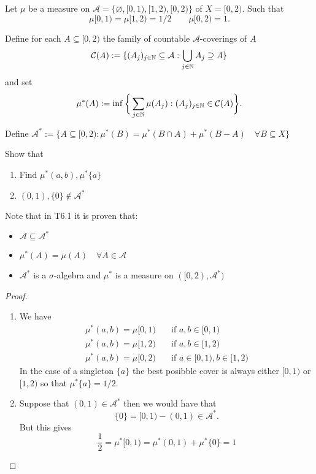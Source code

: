 \begin{thm}[Problem 6.10i]
Let \(\mu \) be a measure on \(\mathcal{A}=\{\varnothing ,[0,1),[1,2),[0,2)\}\) of $X=[0,2)$. Such that
\[
\mu [0,1)=\mu [1,2)=1/2 \qquad \mu [0,2)=1.
\]

Define for each \(A\subseteq [0,2)\) the family of countable \(\mathcal{A}\)-coverings of \(A\)
\[
\mathcal{C}(A):=\{(A_{j})_{j\in \Bbb{N}}\subseteq \mathcal{A} : \bigcup _{j\in \Bbb{N}}A_{j} \supseteq A\}
\]
and set
\[
\mu ^*(A):=\inf\bigg\{\sum _{j\in \Bbb{N}}\mu (A_{j}) : (A_{j})_{j\in \Bbb{N}}\in \mathcal{C}(A)\bigg\}.
\]

Define \(\mathcal{A}^*:=\{A\subseteq [0,2): \mu ^*(B)=\mu ^*(B\cap A)+\mu ^*(B-A) \quad \forall B\subseteq X \}\)

Show that

\begin{enumerate}
  \item Find \(\mu ^*(a,b),\mu ^*\{a\}\)
  \item \((0,1),\{0\}\not\in \mathcal{A}^*\)
\end{enumerate}

\end{thm}

Note that in T6.1 it is proven that:

\begin{itemize}
  \item \(\mathcal{A}\subseteq \mathcal{A}^*\)
  \item \(\mu ^*(A)=\mu (A)  \quad \forall A\in \mathcal{A}\)
  \item \(\mathcal{A}^*\) is a \(\sigma \)-algebra and \(\mu ^*\) is a measure on \(([0,2),\mathcal{A}^*)\)
\end{itemize}
\newpage
\begin{proof}

\begin{enumerate}
  \item We have
\begin{align*}
\mu ^*(a,b)=\mu [0,1) \quad &\text{if } a,b\in [0,1)\\
\mu ^*(a,b)=\mu [1,2) \quad &\text{if } a,b\in [1,2)\\
\mu ^*(a,b)=\mu [0,2) \quad &\text{if } a\in [0,1),b\in [1,2)
\end{align*}
In the case of a singleton \(\{a\}\) the best posibble cover is always either \([0,1)\) or \([1,2)\) so that \(\mu ^*\{a\}=1/2.\)
  \item Suppose that \((0,1)\in \mathcal{A}^*\) then we would have that \[\{0\}=[0,1)-(0,1)\in \mathcal{A}^*.\] But this gives
\[
\frac{1}{2}=\mu ^*[0,1)=\mu ^*(0,1)+\mu ^*\{0\}=1
\]

\end{enumerate}

\end{proof}

